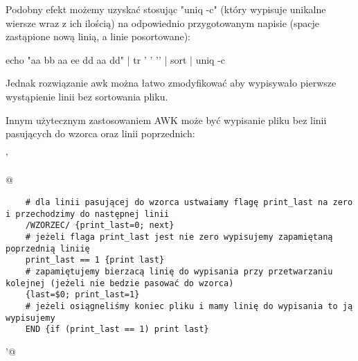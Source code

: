 Podobny efekt możemy uzyskać stosując "uniq -c" (który wypisuje unikalne wiersze wraz z ich ilością)
na odpowiednio przygotowanym napisie (spacje zastąpione nową linią, a linie posortowane):
\begin{CodeFrame*}[bash]{}
echo "aa bb aa ee dd aa dd" | tr ' ' '\n' | sort | uniq -c
\end{CodeFrame*}
Jednak rozwiązanie awk można łatwo zmodyfikować aby wypisywało pierwsze wystąpienie linii bez sortowania pliku.

Innym użytecznym zastosowaniem AWK może być wypisanie pliku bez linii pasujących do wzorca oraz linii poprzednich:

\begin{oframed}\noindent{}\Verb@ '{@\vspace{-0.95em}
\begin{verbatim}
	# dla linii pasującej do wzorca ustwaiamy flagę print_last na zero i przechodzimy do następnej linii
	/WZORZEC/ {print_last=0; next}
	# jeżeli flaga print_last jest nie zero wypisujemy zapamiętaną poprzednią liniię
	print_last == 1 {print last}
	# zapamiętujemy bierzacą linię do wypisania przy przetwarzaniu kolejnej (jeżeli nie bedzie pasować do wzorca)
	{last=$0; print_last=1}
	# jeżeli osiągneliśmy koniec pliku i mamy linię do wypisania to ją wypisujemy
	END {if (print_last == 1) print last}
\end{verbatim}
\vspace{-0.95em}\Verb@}'@\end{oframed}

